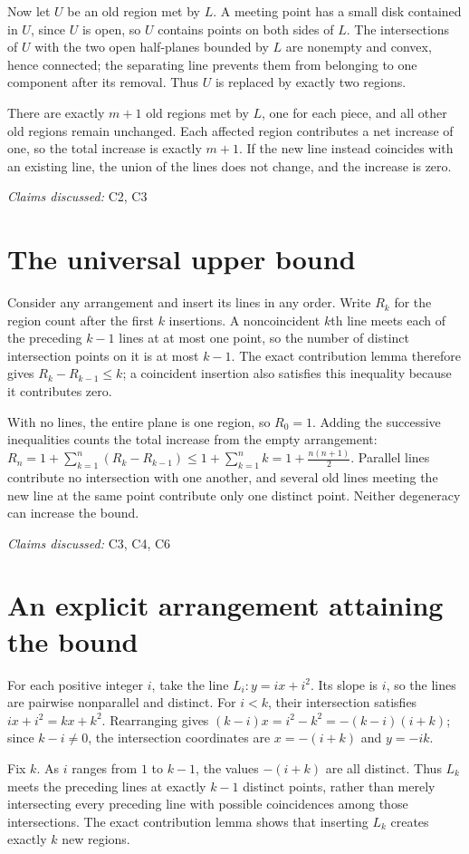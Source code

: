 \documentclass[11pt]{article}
\begin{document}
Now let $U$ be an old region met by $L$. A meeting point has a small disk contained in $U$, since $U$ is open, so $U$ contains points on both sides of $L$. The intersections of $U$ with the two open half-planes bounded by $L$ are nonempty and convex, hence connected; the separating line prevents them from belonging to one component after its removal. Thus $U$ is replaced by exactly two regions.

There are exactly $m+1$ old regions met by $L$, one for each piece, and all other old regions remain unchanged. Each affected region contributes a net increase of one, so the total increase is exactly $m+1$. If the new line instead coincides with an existing line, the union of the lines does not change, and the increase is zero.

\textit{Claims discussed: }C2, C3
\section{The universal upper bound}
Consider any arrangement and insert its lines in any order. Write $R_k$ for the region count after the first $k$ insertions. A noncoincident $k$th line meets each of the preceding $k-1$ lines at at most one point, so the number of distinct intersection points on it is at most $k-1$. The exact contribution lemma therefore gives $R_k-R_{k-1}\leq k$; a coincident insertion also satisfies this inequality because it contributes zero.

With no lines, the entire plane is one region, so $R_0=1$. Adding the successive inequalities counts the total increase from the empty arrangement:
$R_n=1+\sum_{k=1}^{n}(R_k-R_{k-1})\leq 1+\sum_{k=1}^{n}k=1+\frac{n(n+1)}{2}$. Parallel lines contribute no intersection with one another, and several old lines meeting the new line at the same point contribute only one distinct point. Neither degeneracy can increase the bound.

\textit{Claims discussed: }C3, C4, C6
\section{An explicit arrangement attaining the bound}
For each positive integer $i$, take the line $L_i: y=ix+i^2$. Its slope is $i$, so the lines are pairwise nonparallel and distinct. For $i<k$, their intersection satisfies
$ix+i^2=kx+k^2$. Rearranging gives $(k-i)x=i^2-k^2=-(k-i)(i+k)$; since $k-i\neq 0$, the intersection coordinates are $x=-(i+k)$ and $y=-ik$.

Fix $k$. As $i$ ranges from $1$ to $k-1$, the values $-(i+k)$ are all distinct. Thus $L_k$ meets the preceding lines at exactly $k-1$ distinct points, rather than merely intersecting every preceding line with possible coincidences among those intersections. The exact contribution lemma shows that inserting $L_k$ creates exactly $k$ new regions.
\end{document}
